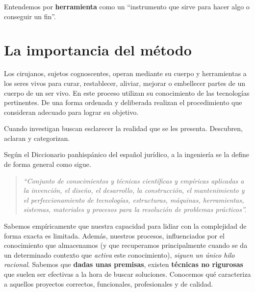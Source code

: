 Entendemos por \textbf{herramienta} como un ``instrumento que sirve para hacer algo o
conseguir un fin''.

\section{La importancia del método}

Los cirujanos, sujetos cognoscentes, operan mediante su cuerpo y herramientas a los seres
vivos para curar, restablecer, aliviar, mejorar o embellecer partes de un cuerpo de
un ser vivo. En este proceso utilizan su conocimiento de las tecnologías pertinentes.
De una forma ordenada y deliberada realizan el procedimiento que consideran adecuado para
lograr su objetivo.

Cuando investigan buscan esclarecer la realidad que se les presenta. Descubren, aclaran y
categorizan.

Según el Diccionario panhispánico del español jurídico, a la ingeniería se la define
de forma general como sigue.

\begin{quote}
    \textit{
    ``Conjunto de conocimientos y técnicas científicas y empíricas aplicadas a la invención,
    el diseño, el desarrollo, la construcción, el mantenimiento y el perfeccionamiento
    de tecnologías, estructuras, máquinas, herramientas, sistemas, materiales y procesos
    para la resolución de problemas prácticos''.
    }
\end{quote}

Sabemos empíricamente que nuestra capacidad para lidiar con la complejidad de forma exacta
es limitada. Además, nuestros procesos, influenciados por el conocimiento que almacenamos (y que recuperamos
principalmente cuando se da un determinado contexto que \textit{activa} este conocimiento),
\textit{siguen un único hilo racional}. Sabemos que \textbf{dadas unas premisas}, existen \textbf{técnicas
no rigurosas} que suelen ser efectivas a la hora de buscar soluciones. Conocemos qué caracteriza
a aquellos proyectos correctos, funcionales, profesionales y de calidad.

